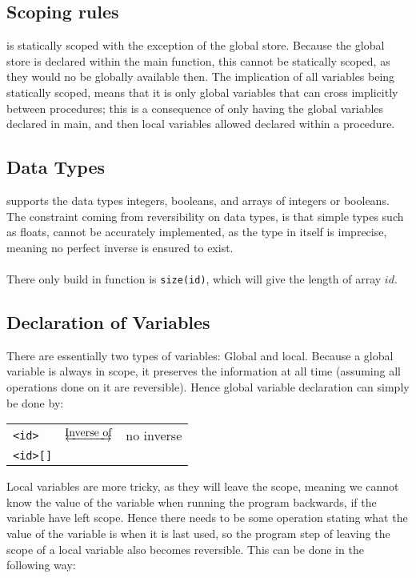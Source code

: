 \subsection{Scoping rules \rr}
\lan is statically scoped with the exception of the global store. Because the global store is
declared within the main function, this cannot be statically scoped, as they would no be globally
available then. The implication of all variables being statically scoped, means that it is only
global variables that can cross implicitly between procedures; this is a consequence of only
having the global variables declared in main, and then local variables allowed declared within a
procedure.

\subsection{Data Types \rr}
\lan supports the data types integers, booleans, and arrays of integers or booleans.
The constraint coming from reversibility on data types, is that simple types such as floats,
cannot be accurately implemented, as the type in itself is imprecise, meaning no perfect inverse
is ensured to exist.
\\
\\
There only build in function is \texttt{size(id)}, which will give the length of array $id$.

\subsection{Declaration of Variables \rr}
There are essentially two types of variables: Global and local. Because a global variable is
always in scope, it preserves the information at all time (assuming all operations done on it
are reversible). Hence global variable declaration can simply be done by:

\begin{table*}[h]
    \centering
    \begin{tabular}{lcl}
        \texttt{<id>} & $\underleftrightarrow{\text{Inverse of}}$ & no inverse \\
        \texttt{<id>[]}
    \end{tabular}
\end{table*}
\noindent
Local variables are more tricky, as they will leave the scope, meaning we cannot know the value
of the variable when running the program backwards, if the variable have left scope. Hence there
needs to be some operation stating what the value of the variable is when it is last used, so
the program step of leaving the scope of a local variable also becomes reversible. This can be
done in the following way:

